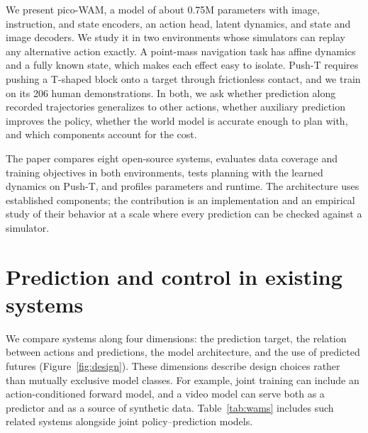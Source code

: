 \documentclass[11pt]{article}
\begin{document}
We present pico-WAM, a model of about 0.75M parameters with image, instruction, and state encoders, an action head, latent dynamics, and state and image decoders. We study it in two environments whose simulators can replay any alternative action exactly. A point-mass navigation task has affine dynamics and a fully known state, which makes each effect easy to isolate. Push-T \citep{chi2023diffusion} requires pushing a T-shaped block onto a target through frictionless contact, and we train on its 206 human demonstrations. In both, we ask whether prediction along recorded trajectories generalizes to other actions, whether auxiliary prediction improves the policy, whether the world model is accurate enough to plan with, and which components account for the cost.

The paper compares eight open-source systems, evaluates data coverage and training objectives in both environments, tests planning with the learned dynamics on Push-T, and profiles parameters and runtime. The architecture uses established components; the contribution is an implementation and an empirical study of their behavior at a scale where every prediction can be checked against a simulator.

\section{Prediction and control in existing systems}
\label{sec:design}

We compare systems along four dimensions: the prediction target, the relation between actions and predictions, the model architecture, and the use of predicted futures (Figure~\ref{fig:design}). These dimensions describe design choices rather than mutually exclusive model classes. For example, joint training can include an action-conditioned forward model, and a video model can serve both as a predictor and as a source of synthetic data. Table~\ref{tab:wams} includes such related systems alongside joint policy--prediction models.
\end{document}

